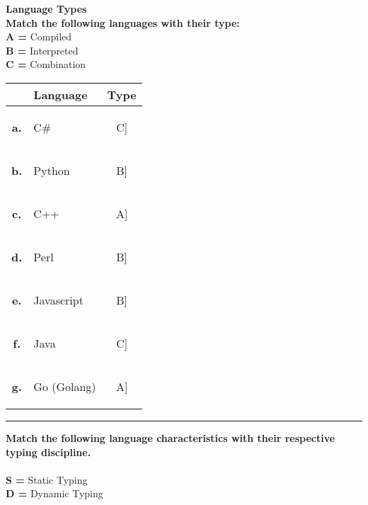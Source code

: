 \documentclass[12pt, addpoints, answers]{exam}
\newif\ifprintanswers
\newcommand{\fillin}[1]{%
  \ifprintanswers
    \textbf{#1}%
  \else
    \underline{\hspace{2mm}}%
  \fi
}
\begin{document}
\begin{questions}
        \LARGE 
        \hspace{-1.3cm}
        \textbf{Language Types}\\
        \normalsize 
	\question \textbf{Match the following languages with their type:} \\
	\textbf{A = }Compiled \\
	\textbf{B = }Interpreted \\
	\textbf{C = }Combination \\
		
	\begin{table}[H]
		\centering
		\begin{tabular}{|c|p{7cm}|c|}
			\hline
			  & \textbf{Language} & \textbf{Type}             \\ \hline
		\textbf{	a.} & C\#               & \rule{0pt}{8mm}\fillin[C] \\ \hline
		\textbf{	b.} & Python            & \rule{0pt}{8mm}\fillin[B] \\ \hline
		\textbf{	c.} & C++               & \rule{0pt}{8mm}\fillin[A] \\ \hline
		\textbf{	d.} & Perl              & \rule{0pt}{8mm}\fillin[B] \\ \hline
		\textbf{	e.} & Javascript        & \rule{0pt}{8mm}\fillin[B] \\ \hline
		\textbf{	f.} & Java              & \rule{0pt}{8mm}\fillin[C] \\ \hline
		\textbf{	g.} & Go (Golang)       & \rule{0pt}{8mm}\fillin[A] \\ \hline
		\end{tabular}
	\end{table}

\rule{6in}{2pt}
  
	\question \textbf{Match the following language characteristics with their respective typing discipline.}\\
 \\
	\textbf{S = }Static Typing\\
	\textbf{D = }Dynamic Typing\\
				

\end{questions}
\end{document}

